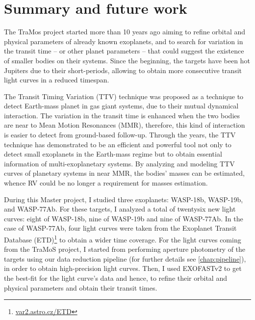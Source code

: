 \chapter{Summary and future work}\label{chap:conclusion}

The TraMos project started more than 10 years ago aiming to refine orbital and physical parameters of already known exoplanets, and to search for variation in the transit time -- or other planet parameters -- that could suggest the existence of smaller bodies on their systems. Since the beginning, the targets have been hot Jupiters due to their short-periods, allowing to obtain more consecutive transit light curves in a reduced timespan. 


The Transit Timing Variation (TTV) technique was proposed as a technique to detect Earth-mass planet in gas giant systems, due to their mutual dynamical interaction. The variation in the transit time is enhanced when the two bodies are near to Mean Motion Resonances (MMR), therefore, this kind of interaction is easier to detect from ground-based follow-up. Through the years, the TTV technique has demonstrated to be an efficient and powerful tool not only to detect small exoplanets in the Earth-mass regime but to obtain essential information of multi-exoplanetary systems. By analyzing and modeling TTV curves of planetary systems in near MMR, the bodies' masses can be estimated, whence RV could be no longer a requirement for masses estimation.

During this Master project, I studied three exoplanets: WASP-18b, WASP-19b, and WASP-77Ab. For these targets, I analyzed a total of twentysix new light curves: eight of WASP-18b, nine of WASP-19b and nine of WASP-77Ab. In the case of WASP-77Ab, four light curves were taken from the Exoplanet Transit Database (ETD)\footnote{\url{var2.astro.cz/ETD}} to obtain a wider time coverage. For the light curves coming from the TraMoS project, I started from performing aperture photometry of the targets using our data reduction pipeline (for further details see \ref{chap:pipeline}), in order to obtain high-precision light curves. Then, I used EXOFASTv2 \cite{Eastman2013,Eastman2017} to get the best-fit for the light curve's data and hence, to refine their orbital and physical parameters and obtain their transit times.

